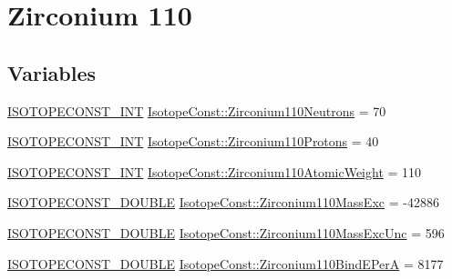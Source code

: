 \hypertarget{group___isotope_const-_zirconium-_zr110}{}\section{Zirconium 110}
\label{group___isotope_const-_zirconium-_zr110}
\subsection*{Variables}
\begin{DoxyCompactItemize}
\item 
\mbox{\hyperlink{group___isotope_const-_macros_ga5f18360b3e99483a35c32d789e62621c}{I\+S\+O\+T\+O\+P\+E\+C\+O\+N\+S\+T\+\_\+\+I\+NT}} \mbox{\hyperlink{group___isotope_const-_zirconium-_zr110_ga63fbc9d18b0deb074d16350224b57e46}{Isotope\+Const\+::\+Zirconium110\+Neutrons}} = 70
\item 
\mbox{\hyperlink{group___isotope_const-_macros_ga5f18360b3e99483a35c32d789e62621c}{I\+S\+O\+T\+O\+P\+E\+C\+O\+N\+S\+T\+\_\+\+I\+NT}} \mbox{\hyperlink{group___isotope_const-_zirconium-_zr110_ga506bb9265d02934eeef396f89938afa1}{Isotope\+Const\+::\+Zirconium110\+Protons}} = 40
\item 
\mbox{\hyperlink{group___isotope_const-_macros_ga5f18360b3e99483a35c32d789e62621c}{I\+S\+O\+T\+O\+P\+E\+C\+O\+N\+S\+T\+\_\+\+I\+NT}} \mbox{\hyperlink{group___isotope_const-_zirconium-_zr110_ga6aedf8acffe9fc68c2e1503031550a94}{Isotope\+Const\+::\+Zirconium110\+Atomic\+Weight}} = 110
\item 
\mbox{\hyperlink{group___isotope_const-_macros_ga8f45a7272ce02c0b4c65c44636ed719a}{I\+S\+O\+T\+O\+P\+E\+C\+O\+N\+S\+T\+\_\+\+D\+O\+U\+B\+LE}} \mbox{\hyperlink{group___isotope_const-_zirconium-_zr110_gaf1fa95f252182f5e8cbf982fa71b7d5c}{Isotope\+Const\+::\+Zirconium110\+Mass\+Exc}} = -\/42886
\item 
\mbox{\hyperlink{group___isotope_const-_macros_ga8f45a7272ce02c0b4c65c44636ed719a}{I\+S\+O\+T\+O\+P\+E\+C\+O\+N\+S\+T\+\_\+\+D\+O\+U\+B\+LE}} \mbox{\hyperlink{group___isotope_const-_zirconium-_zr110_ga01aafc8d224432371be70a3f21c8f165}{Isotope\+Const\+::\+Zirconium110\+Mass\+Exc\+Unc}} = 596
\item 
\mbox{\hyperlink{group___isotope_const-_macros_ga8f45a7272ce02c0b4c65c44636ed719a}{I\+S\+O\+T\+O\+P\+E\+C\+O\+N\+S\+T\+\_\+\+D\+O\+U\+B\+LE}} \mbox{\hyperlink{group___isotope_const-_zirconium-_zr110_ga647bffeaed031db51d7d083302433537}{Isotope\+Const\+::\+Zirconium110\+Bind\+E\+PerA}} = 8177
\item 

\end{DoxyCompactItemize}
